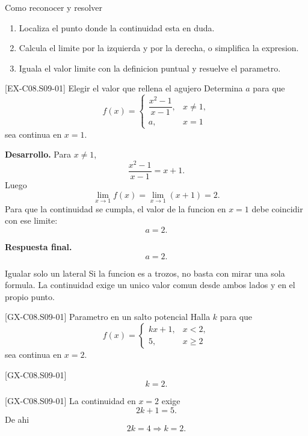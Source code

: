 \begin{methodbox}{Como reconocer y resolver}
\begin{enumerate}
  \item Localiza el punto donde la continuidad esta en duda.
  \item Calcula el limite por la izquierda y por la derecha, o simplifica la expresion.
  \item Iguala el valor limite con la definicion puntual y resuelve el parametro.
\end{enumerate}
\end{methodbox}

\begin{solvedexample}{[EX-C08.S09-01] Elegir el valor que rellena el agujero}
Determina \(a\) para que
\[
f(x)=
\begin{cases}
\dfrac{x^2-1}{x-1},& x\neq 1,\\
a,& x=1
\end{cases}
\]
sea continua en \(x=1\).

\textbf{Desarrollo.} Para \(x\neq 1\),
\[
\frac{x^2-1}{x-1}=x+1.
\]
Luego
\[
\lim_{x\to 1}f(x)=\lim_{x\to 1}(x+1)=2.
\]
Para que la continuidad se cumpla, el valor de la funcion en \(x=1\) debe coincidir con ese
limite:
\[
a=2.
\]

\textbf{Respuesta final.}
\[
a=2.
\]
\end{solvedexample}

\begin{commonerror}{Igualar solo un lateral}
Si la funcion es a trozos, no basta con mirar una sola formula. La continuidad exige un unico
valor comun desde ambos lados y en el propio punto.
\end{commonerror}

\begin{guidedexercise}{[GX-C08.S09-01] Parametro en un salto potencial}
Halla \(k\) para que
\[
f(x)=
\begin{cases}
kx+1,& x<2,\\
5,& x\geq 2
\end{cases}
\]
sea continua en \(x=2\).
\end{guidedexercise}

\begin{shortanswer}{[GX-C08.S09-01]}
\[
k=2.
\]
\end{shortanswer}

\begin{fullsolution}{[GX-C08.S09-01]}
La continuidad en \(x=2\) exige
\[
2k+1=5.
\]
De ahi
\[
2k=4 \Longrightarrow k=2.
\]
\end{fullsolution}

